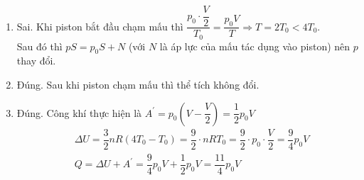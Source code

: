 \begin{ex}
{\begin{enumerate}[label=\alph*)]
		\item Sai. Khi piston bắt đầu chạm mấu thì $\dfrac{p_0 \cdot \dfrac{V}{2}}{T_0}=\dfrac{p_0 V}{T} \Rightarrow T=2T_0<4T_0$.\\
		Sau đó thì $p S=p_0 S+N$ (với $N$ là áp lực của mấu tác dụng vào piston) nên $p$ thay đổi.
		\item Đúng. Sau khi piston chạm mấu thì thể tích không đổi.
		\item Đúng. Công khí thực hiện là $A^{\prime}=p_0\left(V-\dfrac{V}{2}\right)=\dfrac{1}{2} p_0 V$
		$$
		\begin{aligned}
			& \Delta U=\dfrac{3}{2} n R\left(4 T_0-T_0\right)=\dfrac{9}{2} \cdot n R T_0=\dfrac{9}{2} \cdot p_0 \cdot \dfrac{V}{2}=\dfrac{9}{4} p_0 V \\
			& Q=\Delta U+A^{\prime}=\dfrac{9}{4} p_0 V+\dfrac{1}{2} p_0 V=\dfrac{11}{4} p_0 V
		\end{aligned}
		$$
		
	\end{enumerate}
	}
\end{ex}

